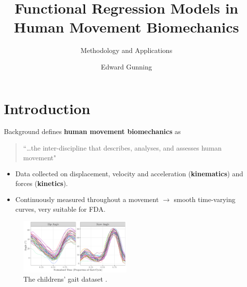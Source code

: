 \documentclass[aspectratio=128,xcolor=dvipsnames, notes]{beamer}
\title[short title]{Functional Regression Models in Human Movement Biomechanics} %
\subtitle{Methodology and Applications}
\author[Edward Gunning] {Edward Gunning}
\date{
    \vskip1em
    JHU Biostatistics Wearable and Implantable Technology Group \\
    \vskip1em
    September $13$th $2024$
} %
\begin{document}
\begin{frame}
    \titlepage
\end{frame}

\section{Introduction}

\begin{frame}{Background}
\textcite{winter_biomechanics_1979} defines \textbf{human movement biomechanics} as
    \begin{quote}
        ``\dots the inter-discipline that describes, analyses, and assesses human movement" 
    \end{quote}

\begin{itemize}
    \pause \item Data collected on displacement, velocity and acceleration (\textbf{kinematics}) and forces (\textbf{kinetics}).
    \pause \item Continuously measured throughout a movement $\rightarrow$ smooth time-varying curves, very suitable for FDA.
\end{itemize}
\vfill
\pause \begin{figure}
    \centering
    \includegraphics[width=0.5\textwidth, page = 1]{figures/thesis-chapt-1-2.pdf}
    \caption{The childrens' gait dataset \parencite{rice_estimating_1991}.}
    \label{fig:enter-label}
\end{figure}
\end{frame}
\end{document}
